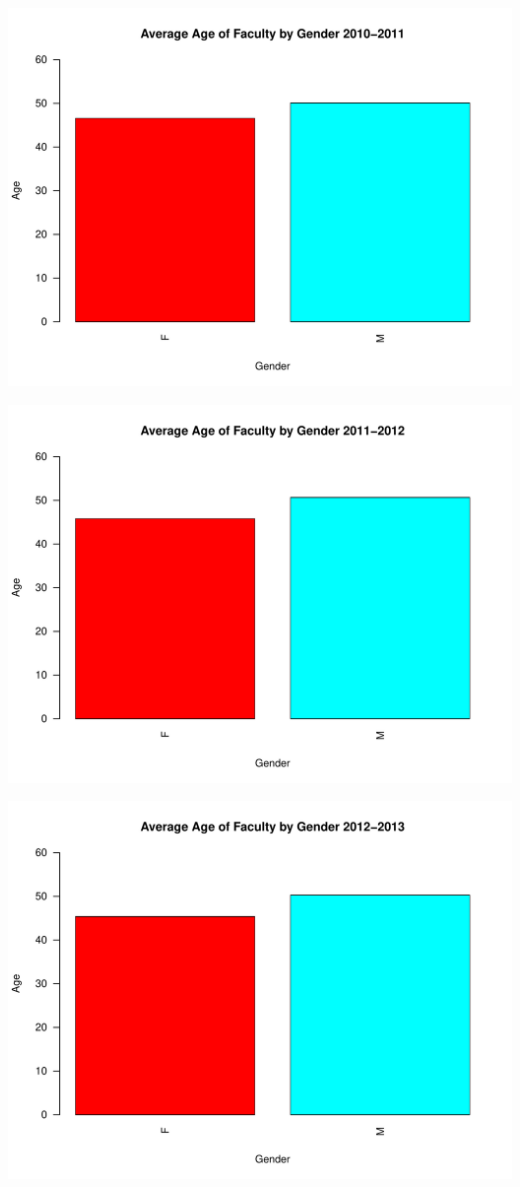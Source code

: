 \documentclass[12pt,a4paper]{article}\usepackage[]{graphicx}\usepackage[]{color}
\makeatletter
\def\maxwidth{ %
  \ifdim\Gin@nat@width>\linewidth
    \linewidth
  \else
    \Gin@nat@width
  \fi
}
\newenvironment{knitrout}{}{} %
\theoremstyle{definition}
\makeatother
\begin{document}
\begin{knitrout}
\includegraphics[width=\maxwidth]{figure/unnamed-chunk-11-7} 

\includegraphics[width=\maxwidth]{figure/unnamed-chunk-11-8} 

\includegraphics[width=\maxwidth]{figure/unnamed-chunk-11-9} 


\end{knitrout}
\end{document}
